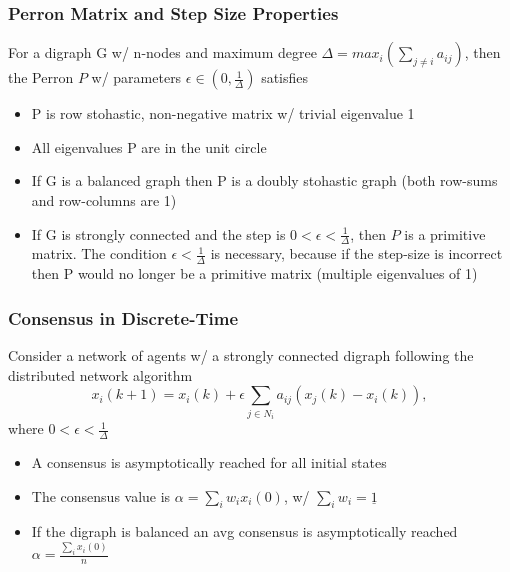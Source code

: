 \documentclass{beamer}
\begin{document}
\begin{frame}
\frametitle{Perron Matrix and Step Size Properties}
For a digraph G w/ n-nodes and maximum degree $\Delta = max_i(\sum_{j\neq i}a_{ij})$, then the Perron $P$ w/ parameters $\epsilon \in (0,\frac{1}{\Delta})$ satisfies
\begin{itemize}
\item P is row stohastic, non-negative matrix w/ trivial eigenvalue 1
\item All eigenvalues P are in the unit circle
\item If G is a balanced graph then P is a doubly stohastic graph (both row-sums and row-columns are 1)
\item If G is strongly connected and the step is $0< \epsilon <\frac{1}{\Delta}$, then $P$ is a primitive matrix. The condition $\epsilon <\frac{1}{\Delta}$ is necessary, because if the step-size is incorrect then P would no longer be a primitive matrix (multiple eigenvalues of 1)
\end{itemize}
\end{frame}


\begin{frame}
\frametitle{Consensus in Discrete-Time}
Consider a network of agents w/ a strongly connected digraph following the distributed network algorithm
\begin{equation*}
x_i(k+1)=x_i(k)+\epsilon \sum_{j\in N_i}a_{ij}(x_j(k)-x_i(k)),
\end{equation*}
where $0< \epsilon <\frac{1}{\Delta}$
\begin{itemize}
\item A consensus is asymptotically reached for all initial states
\item The consensus value is $\alpha = \sum_iw_ix_i(0)$, w/ $\sum_i w_i = \underline{1}$
\item If the digraph is balanced an avg consensus is asymptotically reached $\alpha=\frac{\sum_ix_i(0)}{n}$
\end{itemize}
\end{frame}

%
%
%
\end{document}
